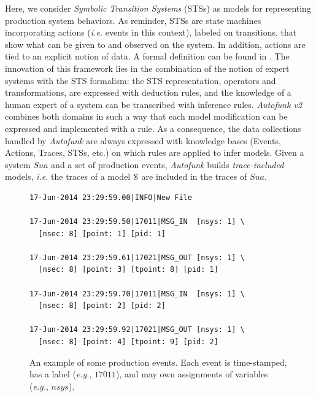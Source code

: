 Here, we consider \textit{Symbolic Transition Systems} (STSs) as
models for representing production system behaviors. As reminder,
STSs are state machines incorporating actions (\emph{i.e.} events
in this context), labeled on transitions, that show what can be
given to and observed on the system. In addition, actions are
tied to an explicit notion of data. A formal definition can
be found in .
The innovation of this framework lies in the combination of the
notion of expert systems with the STS formalism: the STS
representation, operators and transformations, are expressed
with deduction rules, and the knowledge of a human expert of a
system can be transcribed with inference rules.
\textit{Autofunk v2} combines both domains in such a way that
each model modification can be expressed and implemented with a
rule.  As a consequence, the data collections handled by
\textit{Autofunk} are always expressed with knowledge bases
(Events, Actions, Traces, STSs, etc.) on which rules are applied
to infer models. Given a system $\mathit{Sua}$ and a set of
production events, \textit{Autofunk} builds \emph{trace-included}
models, \emph{i.e.} the traces of a model $\EuScript{S}$ are
included in the traces of $\mathit{Sua}$.

\begin{figure}[ht]
\begin{framed}
\begin{BVerbatim}
17-Jun-2014 23:29:59.00|INFO|New File

17-Jun-2014 23:29:59.50|17011|MSG_IN  [nsys: 1] \
  [nsec: 8] [point: 1] [pid: 1]

17-Jun-2014 23:29:59.61|17021|MSG_OUT [nsys: 1] \
  [nsec: 8] [point: 3] [tpoint: 8] [pid: 1]

17-Jun-2014 23:29:59.70|17011|MSG_IN  [nsys: 1] \
  [nsec: 8] [point: 2] [pid: 2]

17-Jun-2014 23:29:59.92|17021|MSG_OUT [nsys: 1] \
  [nsec: 8] [point: 4] [tpoint: 9] [pid: 2]
\end{BVerbatim}
\end{framed}

\caption{An example of some production events. Each event is
time-stamped, has a label (\emph{e.g.}, $17011$), and may own
assignments of variables (\emph{e.g.}, $nsys$).}
\label{fig:rawdatum}
\end{figure}

